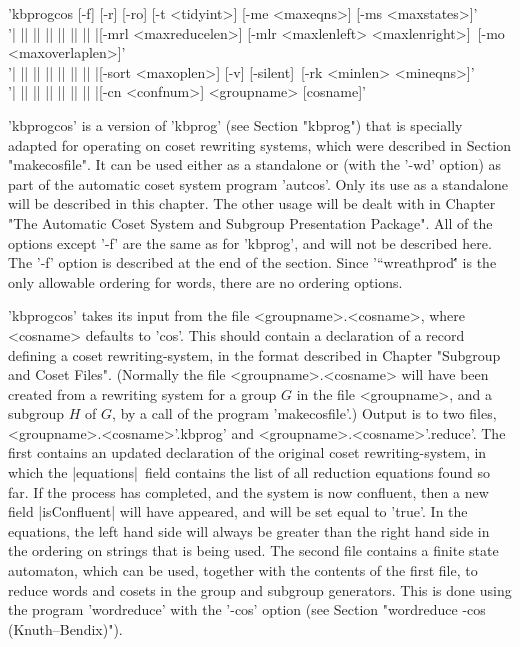 
'kbprogcos  [-f] [-r] [-ro] [-t <tidyint>] [-me <maxeqns>] [-ms <maxstates>]'\\
'| || || || || || || |[-mrl <maxreducelen>] [-mlr <maxlenleft> <maxlenright>]\
[-mo <maxoverlaplen>]'\\
'| || || || || || || |[-sort <maxoplen>] [-v] [-silent]\
[-rk <minlen> <mineqns>]'\\
'| || || || || || || |[-cn <confnum>] <groupname> [cosname]'

'kbprogcos' is a version of 'kbprog' (see Section "kbprog") that is specially
adapted for operating on coset rewriting systems, which were described in
Section "makecosfile".  It can be used either as a standalone or
(with the '-wd' option) as part of the automatic coset system
program 'autcos'. Only its use as a standalone will be described in this
chapter. The other usage will be dealt with in Chapter
"The Automatic Coset System and Subgroup Presentation Package".
All of the options except '-f' are the same as for 'kbprog', and will not
be described here. The '-f' option is described at the end of the section.
Since '``wreathprod\'\''  is the only allowable ordering for words, there are
no ordering options.

'kbprogcos' takes its input from the file <groupname>.<cosname>,
where <cosname> defaults to 'cos'. This should contain a
declaration of a record defining a coset rewriting-system, in the format
described in Chapter "Subgroup and Coset Files".
(Normally  the file <groupname>.<cosname> will have been created
from a rewriting system for a group $G$ in the file <groupname>,
and a subgroup $H$ of $G$, by a call of the program 'makecosfile'.)
Output is to two files, <groupname>.<cosname>'.kbprog' and
<groupname>.<cosname>'.reduce'. The first contains an updated declaration of
the original coset rewriting-system, in which the |equations|\ field contains
the list of all reduction equations found so far. If the process has completed,
and the system is now confluent, then a new field |isConfluent| will
have appeared, and will be set equal to 'true'. In the equations,
the left hand side will always be greater than the right hand side in the
ordering on strings that is being used.
The second file contains a finite state automaton,
which can be used, together with the contents of the first file,
to reduce words and cosets in the group and subgroup generators. This is done
using the program 'wordreduce' with the '-cos' option
(see Section "wordreduce -cos (Knuth--Bendix)").

